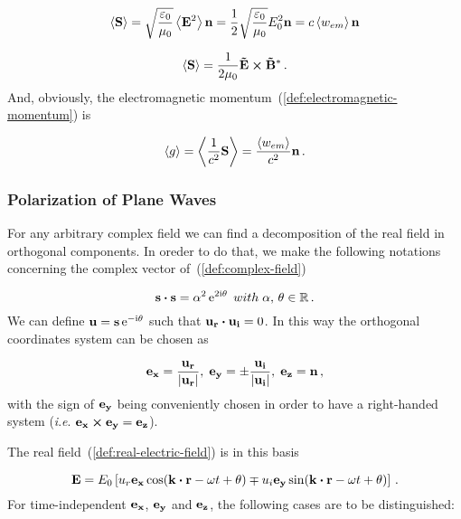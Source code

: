 \documentclass[12pt, class=report, crop=false]{standalone}
\begin{document}
\begin{equation}
\expval{\vb{S}} = \sqrt{\frac{\varepsilon_0}{\mu_0}} \expval{\vb{E}^2} \vb{n} = \frac{1}{2} \sqrt{\frac{\varepsilon_0}{\mu_0}} E_0^2 \vb{n} = c \expval{w_{em}} \vb{n}
\end{equation}

\begin{equation}
\expval{\vb{S}} = \frac{1}{2\mu_0} \vb{\tilde{E}}\cp \vb{\tilde{B}^*} \,.
\end{equation}
And, obviously, the electromagnetic momentum~(\ref{def:electromagnetic-momentum}) is

\begin{equation}
  \expval{g} = \expval{\frac{1}{c^2} \vb{S}} = \frac{\expval{w_{em}}}{c^2} \vb{n} \,.
\end{equation}

\subsubsection{Polarization of Plane Waves}

For any arbitrary complex field we can find a decomposition of the real field in orthogonal components. In oreder to do that, we make the following notations concerning the complex vector of~(\ref{def:complex-field})

\begin{equation}
  \vb{s}\vdot\vb{s} = \alpha^2 \ee^{2 \ii \theta} \; with \; \alpha , \, \theta \in \mathbb{R} \,.
\end{equation}
We can define \(\vb{u} = \vb{s} \operatorname{e}^{-\mathrm{i} \theta}\) such that \(\vb{u_r}\vdot\vb{u_i}=0\). In this way the orthogonal coordinates system can be chosen as

\begin{equation}
  \vb{e_x} = \frac{\vb{u_r}}{\abs{\vb{u_r}}}, \; \vb{e_y} = \pm \frac{\vb{u_i}}{\abs{\vb{u_i}}}, \; \vb{e_z} = \vb{n} \,,
\end{equation}
with the sign of \(\vb{e_y}\) being conveniently chosen in order to have a right-handed system (\textit{i}.\textit{e}. \(\vb{e_x}\cp\vb{e_y} = \vb{e_z}\)).

\par
The real field~(\ref{def:real-electric-field}) is in this basis

\begin{equation}
  \vb{E} = E_0 \left[ u_r \vb{e_x} \cos(\vb{k}\vdot\vb{r}-\omega t + \theta) \mp u_i \vb{e_y} \sin(\vb{k}\vdot\vb{r}-\omega t + \theta) \right] \,.
\end{equation}
For time-independent \(\vb{e_x}\), \(\vb{e_y}\) and \(\vb{e_z}\), the following cases are to be distinguished:
\end{document}
